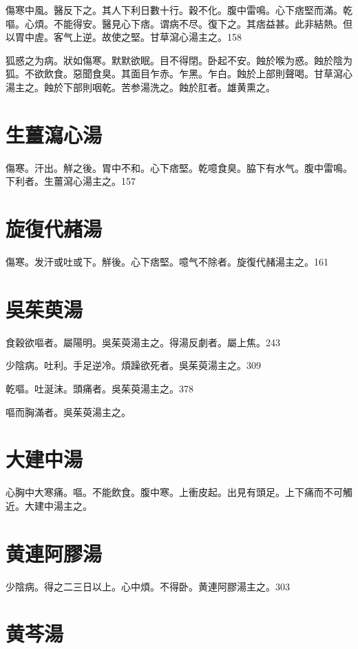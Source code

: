 \documentclass[12pt,twoside,UTF8,b5paper]{ctexbook}
\begin{document}
傷寒中風。醫反下之。其人下利日數十行。穀不化。腹中雷鳴。心下痞堅而滿。乾嘔。心煩。不能得安。醫見心下痞。谓病不尽。復下之。其痞益甚。此非結熱。但以胃中虗。客气上逆。故使之堅。甘草瀉心湯主之。158

狐惑之为病。狀如傷寒。默默欲眠。目不得閉。卧起不安。蝕於喉为惑。蝕於陰为狐。不欲飲食。惡聞食臭。其面目乍赤。乍黑。乍白。蝕於上部則聲喝。甘草瀉心湯主之。蝕於下部則咽乾。苦参湯洗之。蝕於肛者。雄黄熏之。

\section{生薑瀉心湯}

傷寒。汗出。觧之後。胃中不和。心下痞堅。乾噫食臭。脇下有水气。腹中雷鳴。下利者。生薑瀉心湯主之。157

\section{旋復代赭湯}

傷寒。发汗{或}吐{或}下。觧後。心下痞堅。噫气不除者。旋復代赭湯主之。161

\section{吳茱萸湯}

食穀欲嘔者。屬陽明。{吳}茱萸湯主之。得湯反劇者。屬上焦。243

少陰病。吐利。手足逆{冷}。煩躁欲死者。{吳}茱萸湯主之。309

乾嘔。吐涎沫。頭痛者。吳茱萸湯主之。378

嘔而胸滿者。吳茱萸湯主之。

\section{大建中湯}

心胸中大寒痛。嘔。不能飲食。腹中寒。上衝皮起。出見有頭足。上下痛而不可觸近。大建中湯主之。

\section{黄連阿膠湯}

少陰病。得之二三日以上。心中煩。不得卧。黄連阿膠湯主之。303

\section{黄芩湯}
\end{document}
